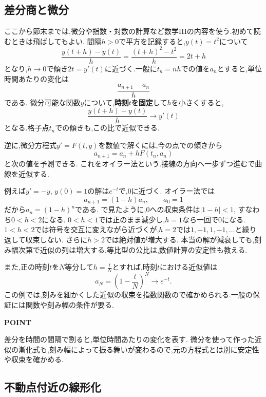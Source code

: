 \subsection{差分商と微分}
ここから節末までは,微分や指数・対数の計算など数学IIIの内容を使う.初めて読むときは飛ばしてもよい.
間隔$h>0$で平方を記録すると,$y(t)=t^2$について
\[
  \frac{y(t+h)-y(t)}h
  =\frac{(t+h)^2-t^2}h=2t+h
\]
となり,$h\to0$で傾き$2t=y'(t)$に近づく.一般に$t_n=nh$での値を$a_n$とすると,単位時間あたりの変化は
\[
  \frac{a_{n+1}-a_n}{h}
\]
である.
微分可能な関数$y$について,\textbf{時刻$t$を固定}して$h$を小さくすると,
\[
  \frac{y(t+h)-y(t)}h\longrightarrow y'(t)
\]
となる.格子点$t_n$での傾きも,この比で近似できる.

逆に,微分方程式$y'=F(t,y)$を数値で解くには,今の点での傾きから
\[
  a_{n+1}=a_n+hF(t_n,a_n)
\]
と次の値を予測できる.
これをオイラー法という.接線の方向へ一歩ずつ進むで曲線を近似する.

例えば$y'=-y$, $y(0)=1$の解は$e^{-t}$で,$0$に近づく.
オイラー法では
\[
  a_{n+1}=(1-h)a_n,\qquad a_0=1
\]
だから$a_n=(1-h)^n$である.
で見たように,$0$への収束条件は$|1-h|<1$, すなわち$0<h<2$になる.
$0<h<1$では正のまま減少し,$h=1$なら一回で$0$になる.
$1<h<2$では符号を交互に変えながら近づくが,$h=2$では$1,-1,1,-1,\ldots$と繰り返して収束しない.
さらに$h>2$では絶対値が増大する.
本当の解が減衰しても,刻み幅次第で近似の列は増大する.等比型の公比は,数値計算の安定性も教える.

また,正の時刻$t$を$N$等分して$h=\frac{t}{N}$とすれば,時刻$t$における近似値は
\[
  a_N=\left(1-\frac{t}{N}\right)^N
  \longrightarrow e^{-t}.
\]
この例では,刻みを細かくした近似の収束を指数関数ので確かめられる.一般の保証には関数や刻み幅の条件が要る.

\begin{bookpoint}
  \textbf{POINT}\par
  差分を時間の間隔で割ると,単位時間あたりの変化を表す.
  微分を使って作った近似の漸化式も,刻み幅によって振る舞いが変わるので,元の方程式とは別に安定性や収束を確かめる.
\end{bookpoint}

\subsection{不動点付近の線形化}\label{節：不動点付近の線形化}

